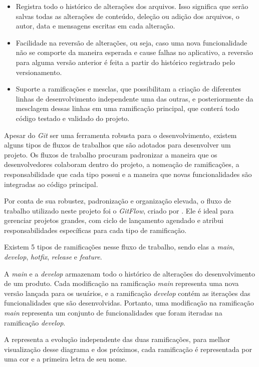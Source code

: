 \begin{itemize}
    \item Registra todo o histórico de alterações dos arquivos. Isso significa que serão salvas todas as alterações de conteúdo, deleção ou adição dos arquivos, o autor, data e mensagens escritas em cada alteração.
    \item Facilidade na reversão de alterações, ou seja, caso uma nova funcionalidade não se comporte da maneira esperada e cause falhas no aplicativo, a reversão para alguma versão anterior é feita a partir do histórico registrado pelo versionamento.
    \item Suporte a ramificações e mesclas, que possibilitam a criação de diferentes linhas de desenvolvimento independente uma das outras, e posteriormente da mesclagem dessas linhas em uma ramificação principal, que conterá todo código testado e validado do projeto.
\end{itemize}

Apesar do \textit{Git} ser uma ferramenta robusta para o desenvolvimento, existem alguns tipos de fluxos de trabalhos que são adotados para desenvolver um projeto. Os fluxos de trabalho procuram padronizar a maneira que os desenvolvedores colaboram dentro do projeto, a nomeação de ramificações, a responsabilidade que cada tipo possui e a maneira que novas funcionalidades são integradas ao código principal.

Por conta de sua robustez, padronização e organização elevada, o fluxo de trabalho utilizado neste projeto foi o \textit{GitFlow}, criado por \textcite{gitflow}. Ele é ideal para gerenciar projetos grandes, com ciclo de lançamento agendado e atribui responsabilidades específicas para cada tipo de ramificação.

Existem 5 tipos de ramificações nesse fluxo de trabalho, sendo elas a \textit{main}, \textit{develop}, \textit{hotfix}, \textit{release} e \textit{feature}.

A \textit{main} e a \textit{develop} armazenam todo o histórico de alterações do desenvolvimento de um produto. Cada modificação na ramificação \textit{main} representa uma nova versão lançada para os usuários, e a ramificação \textit{develop} contém as iterações das funcionalidades que são desenvolvidas. Portanto, uma modificação na ramificação \textit{main} representa um conjunto de funcionalidades que foram iteradas na ramificação \textit{develop}.

A  representa a evolução independente das duas ramificações, para melhor visualização desse diagrama e dos próximos, cada ramificação é representada por uma cor e a primeira letra de seu nome. 

